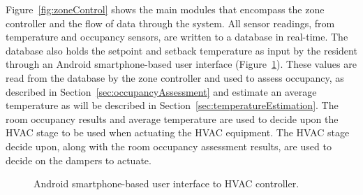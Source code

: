 \begin{figure}[t]
\end{figure}

Figure~\ref{fig:zoneControl} shows the main modules that encompass the zone
controller and the flow of data through the system. All sensor readings, from
temperature and occupancy sensors, are written to a database in real-time. The
database also holds the setpoint and setback temperature as input by the
resident through an Android smartphone-based user interface
(Figure~\ref{fig:android}). These values are read from the database by the zone
controller and used to assess occupancy, as described in
Section~\ref{sec:occupancyAssessment} and estimate an average temperature as
will be described in Section~\ref{sec:temperatureEstimation}. The room occupancy
results and average temperature are used to decide upon the HVAC stage to be
used when actuating the HVAC equipment. The HVAC stage decide upon, along with
the room occupancy assessment results, are used to decide on the dampers to
actuate.

\begin{figure}[!htb]
 \caption{Android smartphone-based user interface to HVAC controller.} 
\label{fig:android}
\end{figure}

